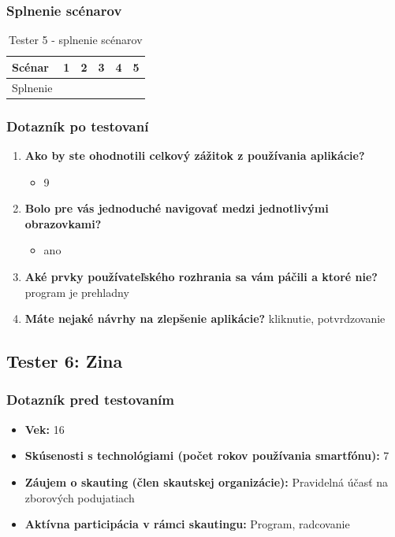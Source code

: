 \subsubsection*{Splnenie scénarov}
\begin{table}[h!]
    \centering
    \begin{tabular}{|l|p{1.5cm}|p{1.5cm}|p{1.5cm}|p{1.5cm}|p{1.5cm}|}
        \hline
        Scénar & 1 & 2 & 3 & 4 & 5 \\ \hline
        Splnenie & & & & & \\ \hline
    \end{tabular}
    \caption{Tester 5 - splnenie scénarov}
\end{table}

\subsubsection*{Dotazník po testovaní}
\begin{enumerate}[leftmargin=*]
    \item \textbf{Ako by ste ohodnotili celkový zážitok z používania aplikácie?}
    \begin{itemize}
        \item 9
    \end{itemize}
    \item \textbf{Bolo pre vás jednoduché navigovať medzi jednotlivými obrazovkami?}
    \begin{itemize}
        \item ano
    \end{itemize}
    \item \textbf{Aké prvky používateľského rozhrania sa vám páčili a ktoré nie?} program je prehladny
    \item \textbf{Máte nejaké návrhy na zlepšenie aplikácie?} kliknutie, potvrdzovanie
\end{enumerate}

\subsection*{Tester 6: Zina}
\subsubsection*{Dotazník pred testovaním}
\begin{itemize}[leftmargin=*]
    \item \textbf{Vek:} 16
    \item \textbf{Skúsenosti s technológiami (počet rokov používania smartfónu):} 7
    \item \textbf{Záujem o skauting (člen skautskej organizácie):} Pravidelná účasť na zborových podujatiach
    \item \textbf{Aktívna participácia v rámci skautingu:} Program, radcovanie
\end{itemize}

